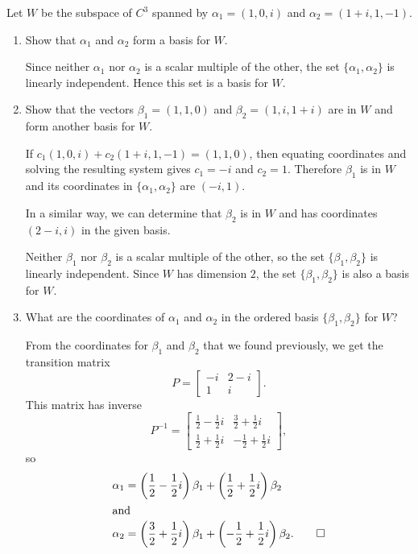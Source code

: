  Let $W$ be the subspace of $C^3$ spanned by
$\alpha_1 = (1,0,i)$ and $\alpha_2 = (1 + i, 1, -1)$.
\begin{enumerate}
\item Show that $\alpha_1$ and $\alpha_2$ form a basis for $W$.
  \begin{solution}
    Since neither $\alpha_1$ nor $\alpha_2$ is a scalar multiple of
    the other, the set $\{\alpha_1, \alpha_2\}$ is linearly
    independent. Hence this set is a basis for $W$.
  \end{solution}

\item Show that the vectors $\beta_1 = (1,1,0)$ and
  $\beta_2 = (1,i,1+i)$ are in $W$ and form another basis for $W$.
  \begin{solution}
    If $c_1(1,0,i) + c_2(1 + i, 1, -1) = (1, 1, 0)$, then equating
    coordinates and solving the resulting system gives $c_1 = -i$ and
    $c_2 = 1$. Therefore $\beta_1$ is in $W$ and its coordinates in
    $\{\alpha_1,\alpha_2\}$ are $(-i,1)$.

    In a similar way, we can determine that $\beta_2$ is in $W$ and
    has coordinates $(2-i,i)$ in the given basis.

    Neither $\beta_1$ nor $\beta_2$ is a scalar multiple of the other,
    so the set $\{\beta_1,\beta_2\}$ is linearly independent. Since
    $W$ has dimension $2$, the set $\{\beta_1,\beta_2\}$ is also a
    basis for $W$.
  \end{solution}

\item What are the coordinates of $\alpha_1$ and $\alpha_2$ in the
  ordered basis $\{\beta_1, \beta_2\}$ for $W$?
  \begin{solution}
    From the coordinates for $\beta_1$ and $\beta_2$ that we found
    previously, we get the transition matrix
    \begin{equation*}
      P =
      \begin{bmatrix}
        -i & 2 - i \\
        1 & i
      \end{bmatrix}.
    \end{equation*}
    This matrix has inverse
    \begin{equation*}
      P^{-1} =
      \begin{bmatrix}
        \frac12 - \frac12i & \frac32 + \frac12i \\[3pt]
        \frac12 + \frac12i & -\frac12 + \frac12i
      \end{bmatrix},
    \end{equation*}
    so
    \begin{align*}
      \alpha_1 &= \left(\frac12 - \frac12i\right)\beta_1
      + \left(\frac12 + \frac12i\right)\beta_2 \\
      \intertext{and}
      \alpha_2 &= \left(\frac32 + \frac12i\right)\beta_1
      + \left(-\frac12 + \frac12i\right)\beta_2. \qedhere
    \end{align*}
  \end{solution}
\end{enumerate}
